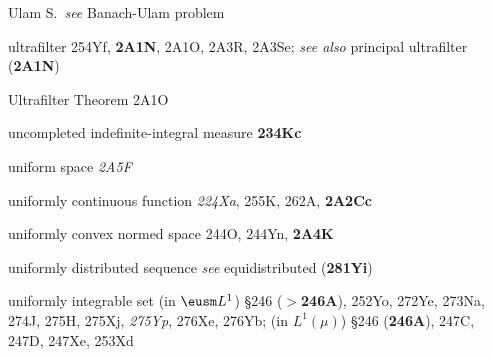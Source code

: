 




\indexmedskip

Ulam S.\ {\it see} Banach-Ulam problem







ultrafilter  254Yf, {\bf 2A1N}, 2A1O, 2A3R, 2A3Se; 
  {\it see also} principal ultrafilter ({\bf 2A1N})




Ultrafilter Theorem 2A1O




uncompleted indefinite-integral measure {\bf 234Kc}




















uniform space {\it 2A5F}















uniformly continuous function {\it 224Xa}, 255K, 262A,
{\bf 2A2Cc}




uniformly convex normed space 244O, 244Yn, {\bf 2A4K}


uniformly distributed sequence {\it see} equidistributed
({\bf 281Yi}) 











uniformly integrable set (in $\eusm L^1$)
\S246 ($\pmb{>}${\bf 246A}), 252Yo, 272Ye, 273Na, 274J,
275H, 275Xj, {\it 275Yp}, 276Xe, 276Yb; 
  (in $L^1(\mu)$) \S246 ({\bf 246A}), 247C, 247D, 247Xe, 253Xd









